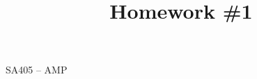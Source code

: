 \documentclass[11pt]{article}
\makeatletter
\theoremstyle{definition}
\renewcommand{\maketitle}{
  \noindent SA405 -- AMP \hfill \\

  \begin{center}\Large{\textbf{\@title}}\end{center}
}
\makeatother
\begin{document}
  
\title{Homework \#1}

\maketitle
\end{document}
